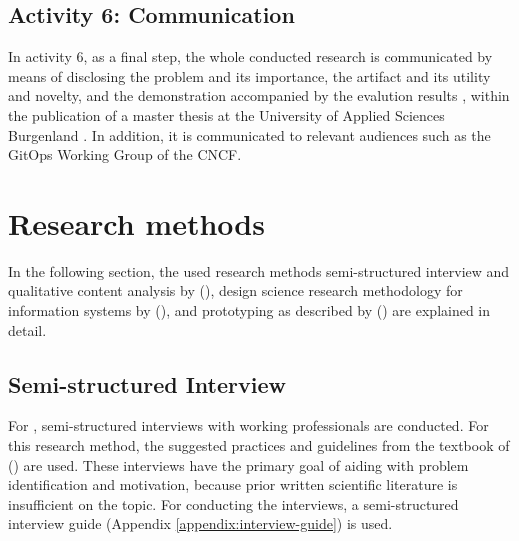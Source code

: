 \subsection{Activity 6: Communication}
\label{methodology:activity6}

\noindent
In activity 6, as a final step,
the whole conducted research is communicated by means of
disclosing
the problem and its importance,
the artifact and its utility and novelty,
and the demonstration accompanied by the evalution results
\autocite{designScienceResearchMethodologyForInformationSystemsResearch},
within the publication of a master thesis at
the University of Applied Sciences Burgenland \autocite{fhBurgenlandWebsite}.
In addition, it is communicated to relevant audiences such as
the GitOps Working Group \autocite{gitopsWG} of the CNCF.






\section{Research methods}

In the following section,
the used research methods
semi-structured interview and qualitative content analysis
by
\citeauthor{glaser2010experteninterviews} (\citeyear{glaser2010experteninterviews}),
design science research methodology for information systems
by
\citeauthor{designScienceResearchMethodologyForInformationSystemsResearch} (\citeyear{designScienceResearchMethodologyForInformationSystemsResearch}),
and prototyping as described
by
\citeauthor{riedlManagementInformatik2019} (\citeyear{riedlManagementInformatik2019})
are explained in detail.





\subsection{Semi-structured Interview}\label{methodology:interview}

For ,
semi-structured interviews with working professionals
are conducted.
For this research method,
the suggested practices and guidelines from
the textbook of
\citeauthor{glaser2010experteninterviews} (\citeyear{glaser2010experteninterviews})
are used.
These interviews have the primary goal of aiding with
problem identification and motivation,
because prior written scientific literature is insufficient on the topic.
For conducting the interviews,
a semi-structured interview guide (Appendix \ref{appendix:interview-guide}) is used.

